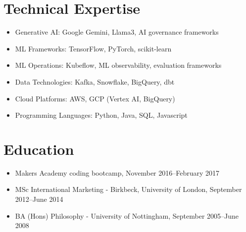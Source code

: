 \documentclass[a4paper]{scrartcl}
\begin{document}
\section*{Technical Expertise}
\begin{itemize}
	\item Generative AI: Google Gemini, Llama3, AI governance frameworks
	\item ML Frameworks: TensorFlow, PyTorch, scikit-learn
	\item ML Operations: Kubeflow, ML observability, evaluation frameworks
	\item Data Technologies: Kafka, Snowflake, BigQuery, dbt
	\item Cloud Platforms: AWS, GCP (Vertex AI, BigQuery)
	\item Programming Languages: Python, Java, SQL, Javascript
\end{itemize}

\section*{Education}
\begin{itemize}
	\item Makers Academy coding bootcamp, November 2016--February 2017
	\item MSc International Marketing - Birkbeck, University of London, September 2012--June 2014
	\item BA (Hons) Philosophy - University of Nottingham, September 2005--June 2008
\end{itemize}
\end{document}
